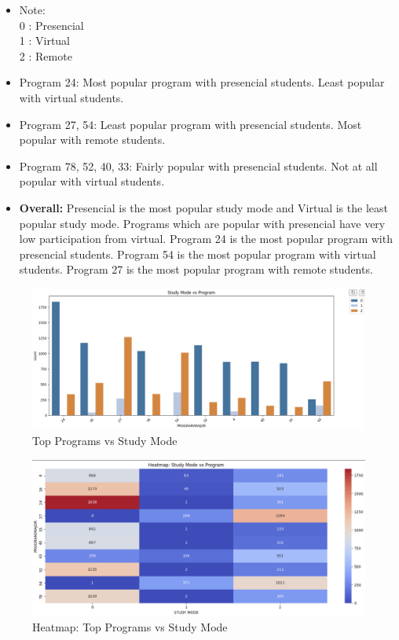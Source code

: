 \documentclass[12pt]{article}
\begin{document}
\begin{itemize}
    \item Note:\\
    0 : Presencial\\
    1 : Virtual\\
    2 : Remote
    
    \item Program 24: Most popular program with presencial students. Least popular with virtual students.

    \item Program 27, 54: Least popular program with presencial students. Most popular with remote students.

    \item Program 78, 52, 40, 33: Fairly popular with presencial students. Not at all popular with virtual students.

    \item \textbf{Overall: }Presencial is the most popular study mode and Virtual is the least popular study mode. Programs which are popular with presencial have very low participation from virtual. Program 24 is the most popular program with presencial students. Program 54 is the most popular program with virtual students. Program 27 is the most popular program with remote students.
\end{itemize}

\begin{figure}[H]
    \centering
    \includegraphics[width=0.9\linewidth]{study_mode.png}
    \caption{Top Programs vs Study Mode}
\end{figure}

\begin{figure}[H]
    \centering
    \includegraphics[width=0.9\linewidth]{heatmap_study_mode.png}
    \caption{Heatmap: Top Programs vs Study Mode}
\end{figure}
\end{document}
